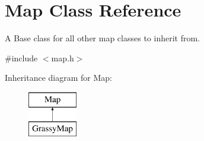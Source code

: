 \hypertarget{classMap}{}\section{Map Class Reference}
\label{classMap}


A Base class for all other map classes to inherit from.  




{\ttfamily \#include $<$map.\+h$>$}

Inheritance diagram for Map\+:\begin{figure}[H]
\begin{center}
\leavevmode
\includegraphics[height=2.000000cm]{classMap}
\end{center}
\end{figure}
